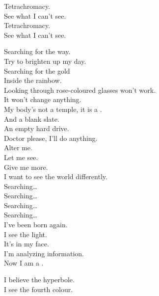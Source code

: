 Tetrachromacy. \\
See what I can't see. \\
Tetrachromacy. \\
See what I can't see. \\




Searching for the way. \\
Try to brighten up my day. \\
Searching for the gold \\
Inside the rainbow. \\
Looking through rose-coloured glasses won't work. \\
It won't change anything. \\

My body's not a temple, it is a . \\
And a blank slate. \\
An empty hard drive. \\
Doctor please, I'll do anything. \\
Alter me. \\
Let me see. \\
Give me more. \\
I want to see the world differently. \\

Searching… \\
Searching… \\
Searching… \\
Searching… \\

I've been born again. \\
I see the light. \\
It's in my face. \\
I'm analyzing information. \\
Now I am a . \\




I believe the hyperbole. \\
I see the fourth colour. \\

